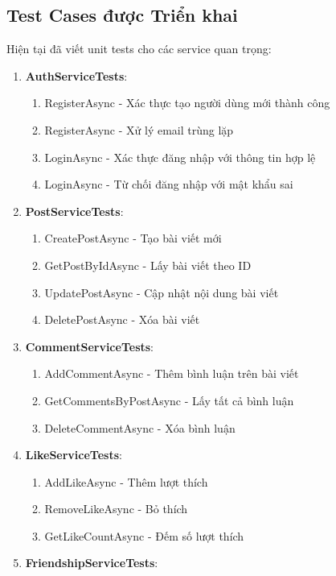 \documentclass[a4paper]{article}
\begin{document}
    \subsection{Test Cases được Triển khai}
    Hiện tại đã viết unit tests cho các service quan trọng:
    \begin{enumerate}
        \item \textbf{AuthServiceTests}: 
        \begin{enumerate}
            \item RegisterAsync - Xác thực tạo người dùng mới thành công
            \item RegisterAsync - Xử lý email trùng lặp
            \item LoginAsync - Xác thực đăng nhập với thông tin hợp lệ
            \item LoginAsync - Từ chối đăng nhập với mật khẩu sai
        \end{enumerate}
        \item \textbf{PostServiceTests}: 
        \begin{enumerate}
            \item CreatePostAsync - Tạo bài viết mới
            \item GetPostByIdAsync - Lấy bài viết theo ID
            \item UpdatePostAsync - Cập nhật nội dung bài viết
            \item DeletePostAsync - Xóa bài viết
        \end{enumerate}
        \item \textbf{CommentServiceTests}: 
        \begin{enumerate}
            \item AddCommentAsync - Thêm bình luận trên bài viết
            \item GetCommentsByPostAsync - Lấy tất cả bình luận
            \item DeleteCommentAsync - Xóa bình luận
        \end{enumerate}
        \item \textbf{LikeServiceTests}: 
        \begin{enumerate}
            \item AddLikeAsync - Thêm lượt thích
            \item RemoveLikeAsync - Bỏ thích
            \item GetLikeCountAsync - Đếm số lượt thích
        \end{enumerate}
        \item \textbf{FriendshipServiceTests}: 

\end{enumerate}
\end{document}
